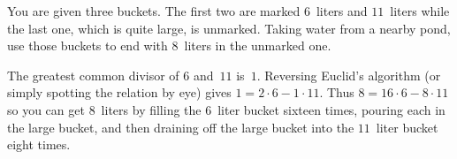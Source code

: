\documentclass{test}  %
\begin{document}
\begin{bezoutproof}
\begin{problem}






\end{problem}

\begin{problem}
You are given three buckets. 
The first two are marked $6$~liters and $11$~liters
while the last one, which is quite large, is unmarked.
Taking water from a nearby pond, use those buckets
to end with $8$~liters in the unmarked one.  
\begin{answer}
The greatest common divisor of $6$ and~$11$ is~$1$.
Reversing Euclid's algorithm (or simply spotting the relation by eye) 
gives $1=2\cdot 6-1\cdot 11$.
Thus $8=16\cdot 6- 8\cdot 11$
so you can get $8$~liters by filling 
the $6$~liter bucket sixteen times, pouring each in the 
large bucket, and then draining off the large bucket into the
$11$~liter bucket eight times.


\end{answer}
\end{problem}
\end{bezoutproof}
\end{document}
